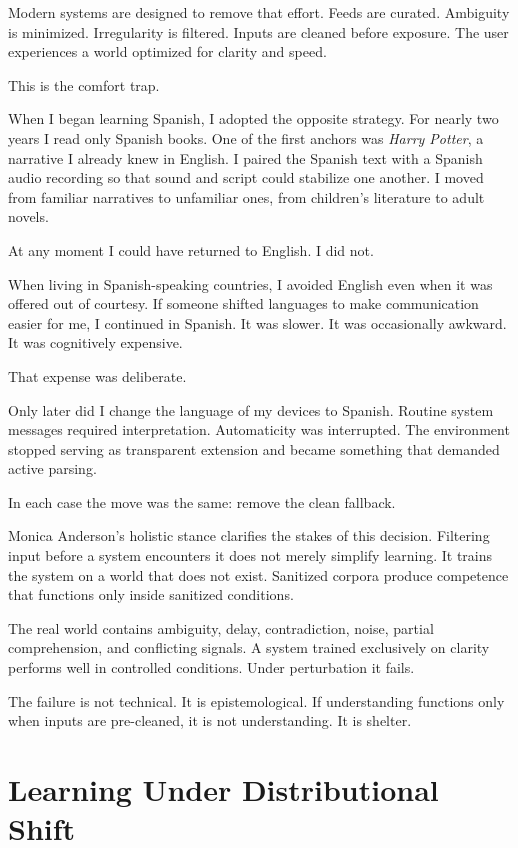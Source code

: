 \documentclass[12pt]{article}
\begin{document}
Modern systems are designed to remove that effort. Feeds are curated. Ambiguity is minimized. Irregularity is filtered. Inputs are cleaned before exposure. The user experiences a world optimized for clarity and speed.

This is the comfort trap.

When I began learning Spanish, I adopted the opposite strategy. For nearly two years I read only Spanish books. One of the first anchors was \emph{Harry Potter}, a narrative I already knew in English. I paired the Spanish text with a Spanish audio recording so that sound and script could stabilize one another. I moved from familiar narratives to unfamiliar ones, from children's literature to adult novels.

At any moment I could have returned to English. I did not.

When living in Spanish-speaking countries, I avoided English even when it was offered out of courtesy. If someone shifted languages to make communication easier for me, I continued in Spanish. It was slower. It was occasionally awkward. It was cognitively expensive.

That expense was deliberate.

Only later did I change the language of my devices to Spanish. Routine system messages required interpretation. Automaticity was interrupted. The environment stopped serving as transparent extension and became something that demanded active parsing.

In each case the move was the same: remove the clean fallback.

Monica Anderson's holistic stance clarifies the stakes of this decision. Filtering input before a system encounters it does not merely simplify learning. It trains the system on a world that does not exist. Sanitized corpora produce competence that functions only inside sanitized conditions.

The real world contains ambiguity, delay, contradiction, noise, partial comprehension, and conflicting signals. A system trained exclusively on clarity performs well in controlled conditions. Under perturbation it fails.

The failure is not technical. It is epistemological. If understanding functions only when inputs are pre-cleaned, it is not understanding. It is shelter.

\section*{Learning Under Distributional Shift}
\end{document}
